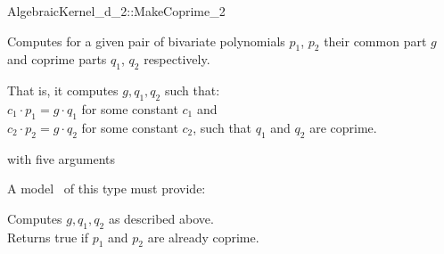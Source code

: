 \begin{ccRefFunctionObjectConcept}{AlgebraicKernel_d_2::MakeCoprime_2}

\ccDefinition
Computes for a given pair of bivariate polynomials $p_1$, $p_2$ their
common part $g$ and coprime parts $q_1$, $q_2$ respectively.

That is, it computes $g, q_1, q_2$ such that:\\
\hspace{1cm} $c_1 \cdot p_1 =  g \cdot q_1$ for some constant $c_1$ and\\
\hspace{1cm} $c_2 \cdot p_2 =  g \cdot q_2$ for some constant $c_2$, 
such that $q_1$ and $q_2$ are coprime. 

\ccRefines 
{} with five arguments 

\ccOperations
{}
A model \ccVar\ of this type must provide:

{ Computes $g, q_1, q_2$ as described above.\\
Returns true if $p_1$ and $p_2$ are already coprime. 
}

\ccSeeAlso
{}\\

\end{ccRefFunctionObjectConcept}
